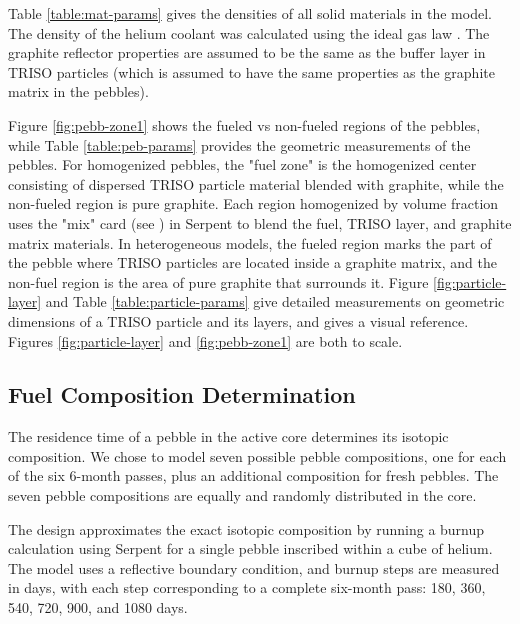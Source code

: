 

Table \ref{table:mat-params} gives the densities of all solid materials in the model.  The density of the helium coolant was calculated using the ideal gas law \cite{mortimer_behavior_2008}.  The graphite reflector properties are assumed to be the same as the buffer layer in TRISO particles (which is assumed to have the same properties as the graphite matrix in the pebbles).



Figure \ref{fig:pebb-zone1} shows the fueled vs non-fueled regions of the pebbles, while Table \ref{table:peb-params} provides the geometric measurements of the pebbles.  For homogenized pebbles, the "fuel zone" is the homogenized center consisting of dispersed TRISO particle material blended with graphite, while the non-fueled region is pure graphite.  Each region homogenized by volume fraction uses the "mix" card (see \cite{leppanenjaakko_serpent_2015}) in Serpent to blend the fuel, TRISO layer, and graphite matrix materials.  In heterogeneous models, the fueled region marks the part of the pebble where TRISO particles are located inside a graphite matrix, and the non-fuel region is the area of pure graphite that surrounds it.  Figure \ref{fig:particle-layer} and Table \ref{table:particle-params} give detailed measurements on geometric dimensions of a TRISO particle and its layers, and gives a visual reference.  Figures \ref{fig:particle-layer} and \ref{fig:pebb-zone1} are both to scale.



\subsection{Fuel Composition Determination}
\label{meth-comp}

The residence time of a pebble in the active core determines its isotopic composition.  We chose to model seven possible pebble compositions, one for each of the six 6-month passes, plus an additional composition for fresh pebbles.  The seven pebble compositions are equally and randomly distributed in the core.

The design approximates the exact isotopic composition by running a burnup calculation using Serpent for a single pebble inscribed within a cube of helium.  The model uses a reflective boundary condition, and burnup steps are measured in days, with each step corresponding to a complete six-month pass: 180, 360, 540, 720, 900, and 1080 days.

